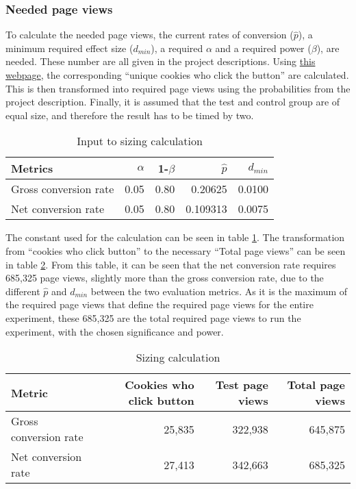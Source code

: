 \documentclass[12pt]{article}
\begin{document}
\subsubsection{Needed page views}
To calculate the needed page views, the current rates of conversion ($\hat{p}$), a minimum required effect size ($d_{min}$), a required $\alpha$ and a required power ($\beta$), are needed. These number are all given in the project descriptions. Using \href{http://www.evanmiller.org/ab-testing/sample-size.html}{this webpage}, the corresponding ``unique cookies who click the button'' are calculated. This is then transformed into required page views using the probabilities from the project description. Finally, it is assumed that the test and control group are of equal size, and therefore the result has to be timed by two.

\begin{table}[h]
\centering
\caption{Input to sizing calculation}
\label{tbl:constants}
\begin{tabular}{@{}lrrrr@{}}
\toprule
Metrics & \textbf{$\alpha$} & 1-$\beta$ & \textbf{$\hat{p}$} & \textbf{$d_{min}$} \\
\midrule
Gross conversion rate 	&	0.05 & 0.80 & 0.20625	 & 0.0100 \\
Net conversion rate 		& 0.05 & 0.80 & 0.109313 & 0.0075 \\
\bottomrule
\end{tabular}
\end{table}

The constant used for the calculation can be seen in table \ref{tbl:constants}. The transformation from ``cookies who click button'' to the necessary ``Total page views'' can be seen in table \ref{tbl:pageviews}. From this table, it can be seen that the net conversion rate requires 685,325 page views, slightly more than the gross conversion rate, due to the different $\hat{p}$ and $d_{min}$ between the two evaluation metrics. As it is the maximum of the required page views that define the required page views for the entire experiment, these 685,325 are the total required page views to run the experiment, with the chosen significance and power. 

\begin{table}[h]
\centering
\caption{Sizing calculation}
\label{tbl:pageviews}
\begin{tabular}{@{}lrrr@{}}
\toprule
\textbf{Metric} & \textbf{Cookies who click button} & \textbf{Test page views} & \textbf{Total page views} \\
\midrule
Gross conversion rate 	&	25,835 & 322,938 & 645,875	 \\
Net conversion rate 		& 27,413 & 342,663 & 685,325 \\
\bottomrule
\end{tabular}
\end{table}
\end{document}
